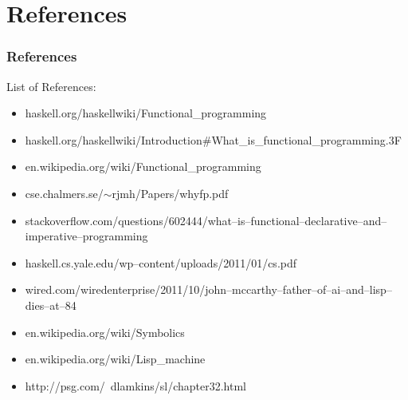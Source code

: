 \documentclass[presentation.tex]{subfiles}
\begin{document}
\section{References}
\begin{frame}
  \frametitle{References}
  List of References:
  \tiny
  \begin{itemize}
    \item haskell.org/haskellwiki/Functional\_programming
    \item haskell.org/haskellwiki/Introduction#What\_is\_functional\_programming.3F
    \item en.wikipedia.org/wiki/Functional\_programming
    \item cse.chalmers.se/$\sim$rjmh/Papers/whyfp.pdf
    \item stackoverflow.com/questions/602444/what--is--functional--declarative--and--imperative--programming
    \item haskell.cs.yale.edu/wp--content/uploads/2011/01/cs.pdf
    \item wired.com/wiredenterprise/2011/10/john--mccarthy--father--of--ai--and--lisp--dies--at--84
    \item en.wikipedia.org/wiki/Symbolics
    \item en.wikipedia.org/wiki/Lisp_machine
    \item http://psg.com/~dlamkins/sl/chapter32.html
  \end{itemize}
  \normalsize
\end{frame}
\end{document}
